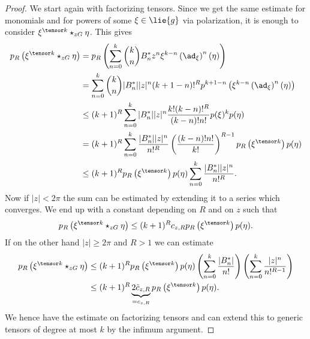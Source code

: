 \begin{proof}
    We start again with factorizing tensors. Since we get the same estimate 
    for monomials and for powers of some $\xi \in \lie{g}$ via polarization, 
    it is enough to consider $\xi^{\tensor k} \ostar_{zG} \eta$. This gives
    \begin{align*}
        p_R \left( \xi^{\tensor k} \ostar_{zG} \eta \right)
        & =
        p_R \left(
        \sum\limits_{n=0}^k
        \binom{k}{n} B_n^* z^n \xi^{k-n}
        \left( \ad_\xi \right)^n (\eta)
        \right)
        \\
        & =
        \sum\limits_{n=0}^k
        \binom{k}{n} |B_n^*| |z|^n
        (k + 1 - n)!^R
        p^{k + 1 - n} 
        \left(
         	\xi^{k-n}
         	\left( \ad_\xi \right)^n (\eta)
        \right)
        \\
        & \leq
        (k + 1)^R
        \sum\limits_{n=0}^k
        |B_n^*| |z|^n
        \frac{k! (k - n)!^R}{(k - n)! n!}
        p(\xi)^k p(\eta)
        \\
        & =
        (k + 1)^R
        \sum\limits_{n=0}^k
        \frac{|B_n^*| |z|^n}{n!^R}
        \left( \frac{(k - n)! n!}{k!} \right)^{R - 1}
        p_R \left( \xi^{\tensor k} \right) p(\eta)
        \\
        & \leq
        (k + 1)^R
        p_R \left( \xi^{\tensor k} \right) p(\eta)
        \sum\limits_{n=0}^k
        \frac{|B_n^*| |z|^n}{n!^R}.
    \end{align*}
    Now if $|z| < 2 \pi$ the sum can be estimated by extending it to a
    series which converges. We end up with a constant depending on $R$
    and on $z$ such that
    \begin{equation*}
        p_R \left( \xi^{\tensor k} \ostar_{zG} \eta \right)
        \leq
        (k + 1)^R c_{z, R}
        p_R \left( \xi^{\tensor k} \right) p(\eta).
    \end{equation*}
    If on the other hand $|z| \geq 2 \pi$ and $R > 1$ we can estimate
    \begin{align*}
        p_R \left( \xi^{\tensor k} \ostar_{zG} \eta \right)
        &\leq
        (k + 1)^R
        p_R \left( \xi^{\tensor k} \right) p(\eta)
        \left(
        \sum\limits_{n=0}^k
        \frac{|B_n^*|}{n!}
        \right) \left(
        \sum\limits_{n=0}^k
        \frac{|z|^n}{n!^{R - 1}}
        \right)
        \\
        &\leq
        (k + 1)^R
        \underbrace{2 \tilde{c}_{z,R}}_{= c_{z,R}}
        p_R \left( \xi^{\tensor k} \right) p(\eta).
    \end{align*}
    We hence have the estimate on factorizing tensors and can extend
    this to generic tensors of degree at most $k$ by the infimum argument.
\end{proof}


